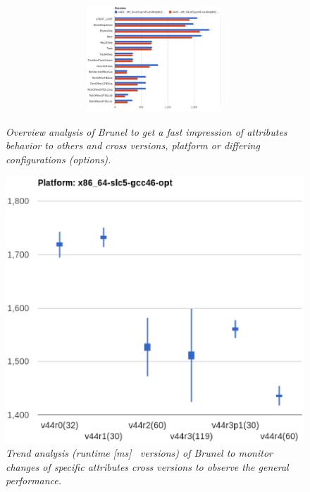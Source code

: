 \documentclass[a4paper]{jpconf}
\begin{document}
\begin{figure}[t]
\begin{minipage}[t]{0.34\textwidth}
\includegraphics[width=1\textwidth, height=4cm]{figures/brunel_overview_analysis.eps}
\caption{\small \textit{Overview analysis of Brunel to get a fast impression of attributes behavior to others and cross versions, platform or differing configurations (options).}}
\label{fig:brunel_overview}
\end{minipage}\hspace{1pc}
\begin{minipage}[t]{0.29\textwidth}
\includegraphics[scale=0.33]{figures/brunel_trend_analysis.eps}
\caption{\small \textit{Trend analysis (runtime [ms] \texttimes\ versions) of Brunel to monitor changes of specific attributes cross versions to observe the general performance.}}
\label{fig:brunel_trend}
\end{minipage}\hspace{1pc}
\begin{minipage}[t]{0.29\textwidth}

\end{minipage}
\end{figure}
\end{document}
